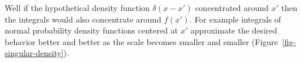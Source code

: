 \documentclass[
  letterpaper,
  DIV=11,
  numbers=noendperiod]{scrartcl}
\begin{document}
Well if the hypothetical density function \(\delta(x - x')\)
concentrated around \(x'\) then the integrals would also concentrate
around \(f(x')\). For example integrals of normal probability density
functions centered at \(x'\) approximate the desired behavior better and
better as the scale becomes smaller and smaller
(Figure~\ref{fig-singular-density}).

\begin{figure}

\begin{minipage}[t]{0.05\linewidth}

{\centering 

~

}

\end{minipage}%
%
\begin{minipage}[t]{0.45\linewidth}

{\centering 


}

\subcaption{\label{fig-narrowing-normals}}
\end{minipage}%
%
\begin{minipage}[t]{0.45\linewidth}

{\centering 

\raisebox{-\height}{

}}
\end{minipage}
\end{figure}
\end{document}
